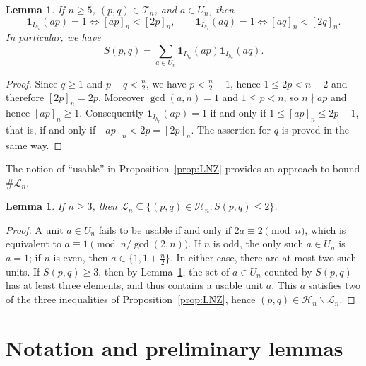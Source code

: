 \documentclass[12pt]{amsart}
\newtheorem{lemma}[theorem]{Lemma}
\theoremstyle{definition}
\begin{document}
\begin{lemma}
\label{lem:Sidentity}
If $n\ge 5$, $(p,q)\in\mathcal{T}_n$, and $a\in U_n$, then
\[
\mathbf{1}_{I_{h_p}}(ap)=1\iff [ap]_n<[2p]_n, \qquad \mathbf{1}_{I_{h_q}}(aq)=1\iff [aq]_n<[2q]_n .
\]
In particular, we have
\[
S(p,q) = \sum_{a\in U_n} \mathbf{1}_{I_{h_p}}(ap) \mathbf{1}_{I_{h_q}}(aq).
\]
\end{lemma}

\begin{proof}
Since $q\ge 1$ and $p+q<\frac n2$, we have $p<\frac n2-1$, hence $1\le 2p<n-2$ and therefore
$[2p]_n=2p$.  Moreover $\gcd(a,n)=1$ and $1\le p<n$, so $n\nmid ap$ and hence $[ap]_n\ge 1$.
Consequently $\mathbf{1}_{I_{h_p}}(ap)=1$ if and only if $1\le [ap]_n\le 2p-1$, that is, if and
only if $[ap]_n<2p=[2p]_n$.  The assertion for $q$ is proved in the same way.
\end{proof}

The notion of ``usable'' in Proposition~\ref{prop:LNZ} provides an approach to bound $\#\mathcal{L}_n$.

\begin{lemma}
\label{lem:usable}
If $n\ge 3$, then $\mathcal{L}_n\subseteq\{(p,q)\in\mathcal{H}_n\colon S(p,q)\le 2\}$.
\end{lemma}

\begin{proof}
A unit $a\in U_n$ fails to be usable if and only if $2a\equiv 2\pmod{n}$, which is equivalent to
$a\equiv 1\pmod{n/\gcd(2,n)}$.  If $n$ is odd, the only such $a\in U_n$ is $a=1$; if $n$ is even,
then $a\in\{1,1+\frac n2\}$.  In either case, there are at most two such units.  If 
$S(p,q)\ge 3$, then by Lemma~\ref{lem:Sidentity}, the set of $a\in U_n$ counted by $S(p,q)$ has at
least three elements, and thus contains a usable unit $a$.  This $a$ satisfies two of the three
inequalities of Proposition~\ref{prop:LNZ}, hence 
$(p,q)\in\mathcal{H}_n\smallsetminus\mathcal{L}_n$.
\end{proof}


\section{Notation and preliminary lemmas}
\label{sec:Prelim}
\end{document}
